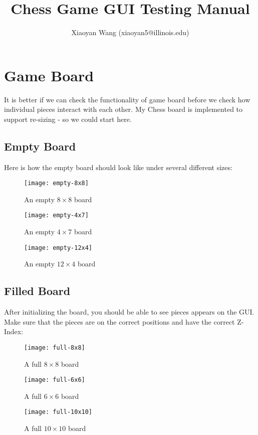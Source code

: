 \documentclass[12pt]{article}
\title{Chess Game GUI Testing Manual}
\author{Xiaoyan Wang (xiaoyan5@illinois.edu)}
\begin{document}
\maketitle

\section{Game Board}

It is better if we can check the functionality of game board before
we check how individual pieces interact with each other. My Chess board
is implemented to support re-sizing - so we could start here.

\subsection{Empty Board}

Here is how the empty board should look like under several different
sizes:

\begin{figure}[!h]
\begin{center}
\texttt{[image: empty-8x8]}
\caption{An empty $8\times 8$ board}
\end{center}
\end{figure}
\begin{figure}[!h]
\begin{center}
\texttt{[image: empty-4x7]}
\caption{An empty $4\times 7$ board}
\end{center}
\end{figure}
\begin{figure}[!h]
\begin{center}
\texttt{[image: empty-12x4]}
\caption{An empty $12\times 4$ board}
\end{center}
\end{figure}

\subsection{Filled Board}

After initializing the board, you should be able to see pieces appears on
the GUI. Make sure that the pieces are on the correct positions and
have the correct Z-Index:
\begin{figure}[!h]
\begin{center}
\texttt{[image: full-8x8]}
\caption{A full $8\times 8$ board}
\end{center}
\end{figure}
\begin{figure}[!h]
\begin{center}
\texttt{[image: full-6x6]}
\caption{A full $6\times 6$ board}
\end{center}
\end{figure}
\begin{figure}[!h]
\begin{center}
\texttt{[image: full-10x10]}
\caption{A full $10\times 10$ board}
\end{center}
\end{figure}
\end{document}
